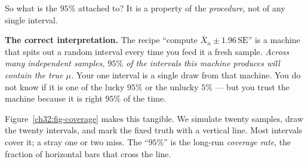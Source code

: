 So what is the $95\%$ attached to? It is a property of the \emph{procedure}, not of any
single interval.

\begin{focusbox}
\textbf{The correct interpretation.} The recipe ``compute $\bar X_n \pm 1.96\,
\mathrm{SE}$'' is a machine that spits out a random interval every time you feed it a
fresh sample. \emph{Across many independent samples, $95\%$ of the intervals this machine
produces will contain the true $\mu$.} Your one interval is a single draw from that
machine. You do not know if it is one of the lucky $95\%$ or the unlucky $5\%$ --- but
you trust the machine because it is right $95\%$ of the time.
\end{focusbox}

Figure~\ref{ch32:fig-coverage} makes this tangible. We simulate twenty samples, draw the
twenty intervals, and mark the fixed truth with a vertical line. Most intervals cover
it; a stray one or two miss. The ``$95\%$'' is the long-run \emph{coverage rate}, the
fraction of horizontal bars that cross the line.

